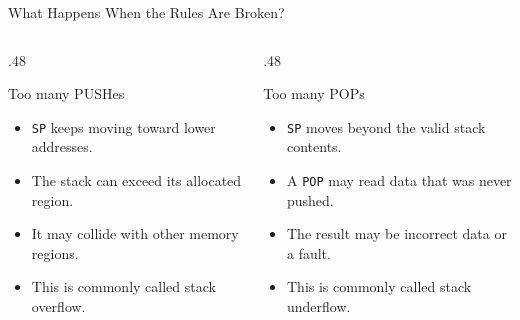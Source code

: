 \documentclass[9pt,aspectratio=169,xcolor=table]{beamer}
\begin{document}
\begin{frame}{What Happens When the Rules Are Broken?}  \vspace{3mm} \begin{columns}[T] \begin{column}{.48\textwidth} \begin{block}{Too many PUSHes} \begin{itemize}\itemsep2pt \item \texttt{SP} keeps moving toward lower addresses. \item The stack can exceed its allocated region. \item It may collide with other memory regions. \item This is commonly called \alert{stack overflow}. \end{itemize} \end{block} \end{column} \begin{column}{.48\textwidth} \begin{block}{Too many POPs} \begin{itemize}\itemsep2pt \item \texttt{SP} moves beyond the valid stack contents. \item A \texttt{POP} may read data that was never pushed. \item The result may be incorrect data or a fault. \item This is commonly called \alert{stack underflow}. \end{itemize} \end{block} \end{column} \end{columns} \end{frame}
\end{document}
